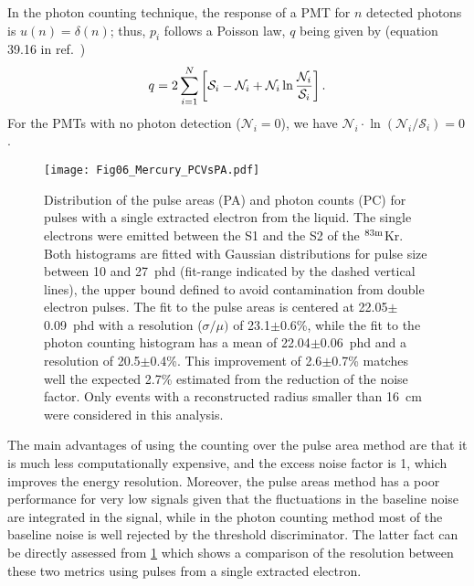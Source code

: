 \documentclass[a4paper,11pt]{article}
\begin{document}
In the photon counting technique, the response of a PMT for $n$ detected photons is $u(n)=\delta(n)$; thus, $p_i$ follows a Poisson law, $q$ being given by (equation 39.16 in ref.\ \cite{PDG2014})
\begin{equation}
q  =  2\sum_{i=1}^N \left[{\mathcal S}_i-\mathcal{N}_i + \mathcal{N}_i\ln\frac{\mathcal{N}_i}{\mathcal{S}_i}\right].\\
\label{LikelihoodPoisson}
\end{equation}
For the PMTs with no photon detection ($\mathcal{N}_i=0$), we have $\mathcal{N}_i\cdot\ln(\mathcal{N}_i/\mathcal{S}_i)=0$.

\begin{figure}
 \begin{center}
  \texttt{[image: Fig06\_Mercury\_PCVsPA.pdf]}
  \caption{
  Distribution of the pulse areas (PA) and photon counts (PC) for pulses with a single extracted electron from the liquid. The single electrons were emitted between the S1 and the S2 of the ${}^{\rm 83m}$Kr. Both histograms are fitted with Gaussian distributions  for pulse size between 10 and 27~phd (fit-range indicated by the dashed vertical lines), the upper bound  defined to avoid contamination from double electron pulses. The fit to the pulse areas is centered at 22.05$\pm$0.09~phd with a resolution ($\sigma/\mu)$ of 23.1$\pm$0.6\%, while the fit to the photon counting histogram has a mean of 22.04$\pm$0.06~phd and a resolution of 20.5$\pm$0.4\%. This improvement of 2.6$\pm$0.7\% matches well the expected 2.7\% estimated from the reduction of the noise factor. Only events with a reconstructed radius smaller than 16~cm were considered in this analysis.}
 \label{Fig02_Mercury_PCVsPA}
 \end{center}
\end{figure}

The main advantages of using the counting over the pulse area method are that it is much less computationally  expensive, and the excess noise factor  is 1, which improves the energy resolution. Moreover, the pulse areas method has a poor performance for very low signals given that the fluctuations in the baseline noise are integrated in the signal, while in the photon counting method most of the baseline noise is well rejected by the threshold discriminator. The latter fact can be directly assessed from \cref{Fig02_Mercury_PCVsPA} which shows a  comparison of the resolution  between these two metrics using pulses from a single extracted electron.
\end{document}
